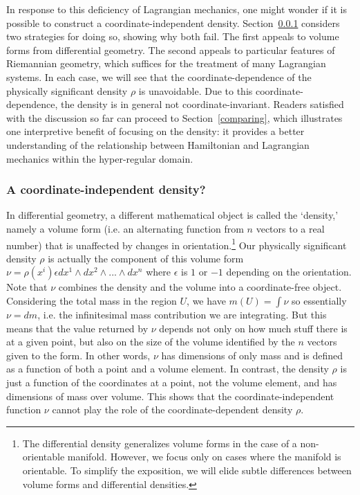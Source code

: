 \documentclass[letterpaper]{article}
\begin{document}
In response to this deficiency of Lagrangian mechanics, one might wonder if it is possible to construct a coordinate-independent density. Section~\ref{independence} considers two strategies for doing so, showing why both fail. The first appeals to volume forms from differential geometry. The second appeals to particular features of Riemannian geometry, which suffices for the treatment of many Lagrangian systems. In each case, we will see that the coordinate-dependence of the physically significant density $\rho$ is unavoidable. Due to this coordinate-dependence, the density is in general not coordinate-invariant. Readers satisfied with the discussion so far can proceed to Section~\ref{comparing}, which illustrates one interpretive benefit of focusing on the density: it provides a better understanding of the relationship between Hamiltonian and Lagrangian mechanics within the hyper-regular domain. 

\subsubsection{A coordinate-independent density?}
\label{independence}

In differential geometry, a different mathematical object is called the `density,' namely a volume form (i.e. an alternating function from $n$ vectors to a real number) that is unaffected by changes in orientation.\footnote{The differential density generalizes volume forms in the case of a non-orientable manifold. However, we focus only on cases where the manifold is orientable. To simplify the exposition, we will elide subtle differences between volume forms and differential densities.} Our physically significant density $\rho$ is actually the component of this volume form $\nu = \rho(x^i)  \epsilon dx^1 \wedge dx^2 \wedge ... \wedge dx^n$ where $\epsilon$ is $1$ or $-1$ depending on the orientation. Note that $\nu$ combines the density and the volume into a coordinate-free object. Considering the total mass in the region $U$, we have $m(U) = \int \nu$ so essentially $\nu = dm$, i.e. the infinitesimal mass contribution we are integrating. But this means that the value returned by $\nu$ depends not only on how much stuff there is at a given point, but also on the size of the volume identified by the $n$ vectors given to the form. In other words, $\nu$ has dimensions of only mass and is defined as a function of both a point and a volume element. In contrast, the density $\rho$ is just a function of the coordinates at a point, not the volume element, and has dimensions of mass over volume. This shows that the coordinate-independent function $\nu$ cannot play the role of the coordinate-dependent density $\rho$. 
\end{document}

